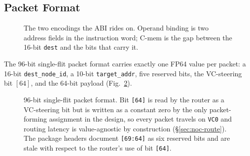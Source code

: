 \documentclass[journal,10pt]{IEEEtran}
\theoremstyle{plain}
\theoremstyle{definition}
\theoremstyle{remark}
\newcommand{\sv}[1]{\texttt{#1}}
\begin{document}
\subsection{Packet Format}\label{sec:fabric-packet}

\begin{figure}[!t]\centering

\caption{The two encodings the ABI rides on. Operand binding is two address fields in the instruction word; \textsf{C-mem} is the gap between the 16-bit \sv{dest} and the \SendAddrBits{} bits that carry it.}\label{fig:isa}
\end{figure}


The 96-bit single-flit packet format carries exactly one FP64 value per
packet: a 16-bit \texttt{dest\_node\_id}, a 10-bit \texttt{target\_addr},
five reserved bits, the VC-steering bit $[64]$, and the 64-bit payload
(Fig.~\ref{fig:packet}).

\begin{figure}[!t]
\centering
{}
\caption{96-bit single-flit packet format. Bit \texttt{[64]} is read by
  the router as a VC-steering bit but is written as a constant zero by the
  only packet-forming assignment in the design, so every packet travels on
  \sv{VC0} and routing latency is value-agnostic by construction
  (\S\ref{sec:noc-route}). The package headers document \texttt{[69:64]} as
  six reserved bits and are stale with respect to the router's use of bit
  \texttt{[64]}.}
\label{fig:packet}
\end{figure}
\end{document}
